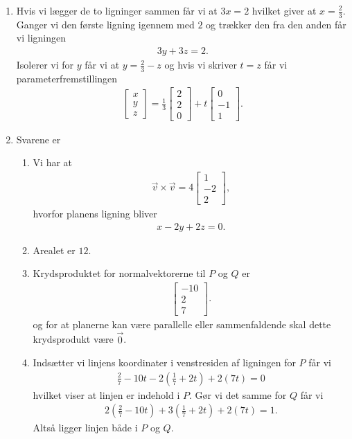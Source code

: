 \begin{enumerate}
	\item Hvis vi lægger de to ligninger sammen får vi at $3x=2$ hvilket giver at $x=\frac{2}{3}$. Ganger vi den første ligning igennem med $2$ og trækker den fra den anden får vi ligningen
	\begin{align*}
	3y+3z=2.
	\end{align*}
	Isolerer vi for $y$ får vi at $y=\frac{2}{3}-z$ og hvis vi skriver $t=z$ får vi parameterfremstillingen
	\begin{align*}
	\begin{bmatrix}
	x\\y\\z
	\end{bmatrix}=\frac{1}{3}\begin{bmatrix}
	2\\2\\0
	\end{bmatrix}+t \begin{bmatrix}
	0\\-1\\1
	\end{bmatrix}.
	\end{align*}
	
	
	
	\item Svarene er
	\begin{enumerate}
		\item Vi har at 
		\begin{align*}
		\vec{v}\times \vec{v}=4\begin{bmatrix}
		1\\-2\\2
		\end{bmatrix},
		\end{align*}
		hvorfor planens ligning bliver
		\begin{align*}
		x-2y+2z=0.
		\end{align*}
		\item Arealet er $12$.
		\item Krydsproduktet for normalvektorerne til $P$ og $Q$ er
		\begin{align*}
		\begin{bmatrix}
		-10\\2\\7
		\end{bmatrix}.
		\end{align*}
		og for at planerne kan være parallelle eller sammenfaldende skal dette krydsprodukt være $\vec{0}$.
		\item Indsætter vi linjens koordinater i venstresiden af ligningen for $P$ får vi
		\begin{align*}
		\frac{2}{7}-10t-2(\frac{1}{7}+2t)+2(7t)=0
		\end{align*}
		 hvilket viser at linjen er indehold i $P$. Gør vi det samme for $Q$ får vi
		 \begin{align*}
		 2(\frac{2}{7}-10t)+3(\frac{1}{7}+2t)+2(7t)=1.
		 \end{align*}
		Altså ligger linjen både i $P$ og $Q$.
	\end{enumerate}


\end{enumerate}
